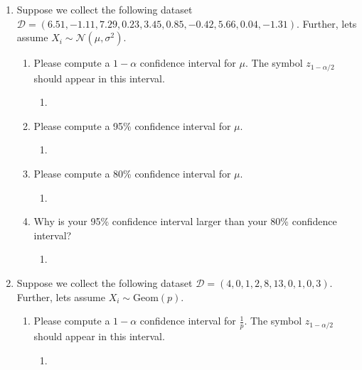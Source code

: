 \documentclass[krantz1,ChapterTOCs]{krantz}
\begin{document}
\begin{enumerate}
\begin{enumerate}
{            } 
        \end{enumerate}

    \clearpage
    \item Suppose we collect the following dataset $\mathcal{D} = ( 6.51, -1.11,  7.29,  0.23,  3.45,  0.85, -0.42,  5.66,  0.04, -1.31 )$. Further, lets assume $X_{i} \sim \mathcal{N}(\mu,\sigma^{2})$.
    \begin{enumerate}
        \item Please compute a $1-\alpha$ confidence interval for $\mu$. The symbol $z_{1-\alpha/2}$ should appear in this interval. 
        \begin{enumerate}
            \item {
            \color{red} 
        
            } 
        \end{enumerate}

        \item Please compute a 95\% confidence interval for $\mu$.
        \begin{enumerate}
            \item {
            \color{red} 
        
            } 
        \end{enumerate}

        \item Please compute a 80\% confidence interval for $\mu$.
        \begin{enumerate}
            \item {
            \color{red} 
        
            } 
        \end{enumerate}

        \item Why is your 95\% confidence interval larger than your 80\% confidence interval?
        \begin{enumerate}
            \item {
            \color{red} 
        
            } 
        \end{enumerate}

    \end{enumerate}
    
    \item Suppose we collect the following dataset $\mathcal{D} = (4, 0,  1, 2, 8, 13, 0, 1, 0, 3)$. Further, lets assume $X_{i} \sim \text{Geom}(p)$.
        \begin{enumerate}
            \item Please compute a $1-\alpha$ confidence interval for $\frac{1}{p}$. The symbol $z_{1-\alpha/2}$ should appear in this interval. 
            \begin{enumerate}
                 \item {
                     \color{red} 
        
}
\end{enumerate}
\end{enumerate}
\end{enumerate}
\end{document}
